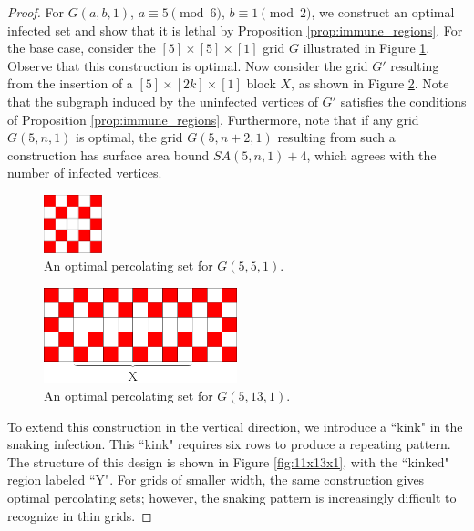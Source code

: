 \begin{proof}
For $G(a,b,1)$, $a \equiv 5 \pmod 6$, $b \equiv 1 \pmod 2$, we construct an optimal infected set and show that it is lethal by Proposition \ref{prop:immune_regions}. For the base case, consider the $[5] \times [5] \times [1]$ grid $G$ illustrated in Figure \ref{fig:5x5x1}. Observe that this construction is optimal. Now consider the grid $G'$ resulting from the insertion of a $[5] \times [2k] \times [1]$ block $X$, as shown in Figure \ref{fig:5x13x1}. Note that the subgraph induced by the uninfected vertices of $G'$ satisfies the conditions of Proposition \ref{prop:immune_regions}. Furthermore, note that if any grid $G(5, n, 1)$ is optimal, the grid $G(5,n+2,1)$ resulting from such a construction has surface area bound $SA(5,n,1) + 4$, which agrees with the number of infected vertices.

\begin{figure}[]
\centering
\includegraphics[width=0.15\textwidth]{figures/7/5x5x1.pdf}
\caption{An optimal percolating set for $G(5,5,1)$.}
\label{fig:5x5x1}
\end{figure} 

\begin{figure}[]
\centering
\includegraphics[width=0.5\textwidth]{figures/7/5x13x1.pdf}
\caption{An optimal percolating set for $G(5,13,1)$.}
\label{fig:5x13x1}
\end{figure} 

To extend this construction in the vertical direction, we introduce a ``kink" in the snaking infection. This ``kink" requires six rows to produce a repeating pattern. The structure of this design is shown in Figure \ref{fig:11x13x1}, with the ``kinked" region labeled ``Y". For grids of smaller width, the same construction gives optimal percolating sets; however, the snaking pattern is increasingly difficult to recognize in thin grids.
\end{proof}

